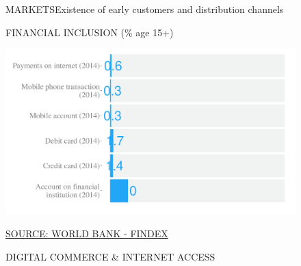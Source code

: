 \documentclass{article}\usepackage[]{graphicx}\usepackage[]{color}
\makeatletter
\def\maxwidth{ %
  \ifdim\Gin@nat@width>\linewidth
    \linewidth
  \else
    \Gin@nat@width
  \fi
}
\makeatother
\begin{document}
\begin{figure}
\begin{minipage}[c]{0.95\textwidth}
  \vspace{5ex}
  \begin{minipage}[b]{0.95\textwidth}
    \begin{flushleft}  
      \Large{\textcolor[HTML]{22A6F5}{MARKETS}}\hspace{2ex}\small{\textcolor[HTML]{818181} {Existence of early customers and distribution channels}}
    \end{flushleft}
    \begin{minipage}[c]{0.48\textwidth} %
      \small{\textcolor[HTML]{818181}{FINANCIAL INCLUSION \footnotesize(\% age 15+)}}


{\centering \includegraphics[width=\maxwidth]{figure/bar_chart_Markets-1} 

}



      \vspace*{-0.1cm} 
      \scriptsize{\href{http://www.worldbank.org/en/programs/globalfindex}{\textcolor[HTML]{22A6F5}{SOURCE: WORLD BANK - FINDEX}}}
    \end{minipage}
    \begin{minipage}[c]{0.48\textwidth} %
      \small{\textcolor[HTML]{818181}{DIGITAL COMMERCE \& INTERNET ACCESS}}
      \vspace{1ex}



\end{minipage}
\end{minipage}
\end{minipage}
\end{figure}
\end{document}
